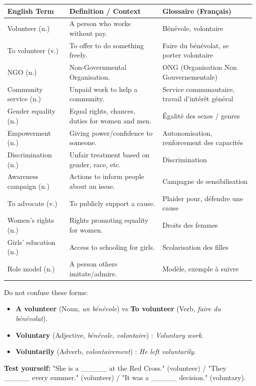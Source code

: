 \documentclass[11pt]{article}
\newcommand{\cle}[1]{{\popxbold\color{popdark}#1}}
\begin{document}
\begin{definition}
\begin{center}
\begin{tabularx}{\linewidth}{|l|X|l|}\hline
\textbf{English Term} & \textbf{Definition / Context} & \textbf{Glossaire (Français)} \\ \hline
\cle{Volunteer} (n.) & A person who works without pay. & Bénévole, volontaire \\ \hline
\cle{To volunteer} (v.) & To offer to do something freely. & Faire du bénévolat, se porter volontaire \\ \hline
\cle{NGO} (n.) & Non-Governmental Organisation. & ONG (Organisation Non Gouvernementale) \\ \hline
\cle{Community service} (n.) & Unpaid work to help a community. & Service communautaire, travail d'intérêt général \\ \hline
\cle{Gender equality} (n.) & Equal rights, chances, duties for women and men. & Égalité des sexes / genres \\ \hline
\cle{Empowerment} (n.) & Giving power/confidence to someone. & Autonomisation, renforcement des capacités \\ \hline
\cle{Discrimination} (n.) & Unfair treatment based on gender, race, etc. & Discrimination \\ \hline
\cle{Awareness campaign} (n.) & Actions to inform people about an issue. & Campagne de sensibilisation \\ \hline
\cle{To advocate} (v.) & To publicly support a cause. & Plaider pour, défendre une cause \\ \hline
\cle{Women's rights} (n.) & Rights promoting equality for women. & Droits des femmes \\ \hline
\cle{Girls' education} (n.) & Access to schooling for girls. & Scolarisation des filles \\ \hline
\cle{Role model} (n.) & A person others imitate/admire. & Modèle, exemple à suivre \\ \hline
\end{tabularx}
\end{center}
\end{definition}

\begin{attention}
Do not confuse these forms:
\begin{itemize}
    \item \textbf{A volunteer} (Noun, \emph{un bénévole}) vs \textbf{To volunteer} (Verb, \emph{faire du bénévolat}).
    \item \textbf{Voluntary} (Adjective, \emph{bénévole, volontaire}) : \textit{Voluntary work}.
    \item \textbf{Voluntarily} (Adverb, \emph{volontairement}) : \textit{He left voluntarily}.
\end{itemize}
\textbf{Test yourself:} "She is a \_\_\_\_\_ at the Red Cross." (volunteer) / "They \_\_\_\_\_ every summer." (volunteer) / "It was a \_\_\_\_\_ decision." (voluntary).
\end{attention}
\end{document}
